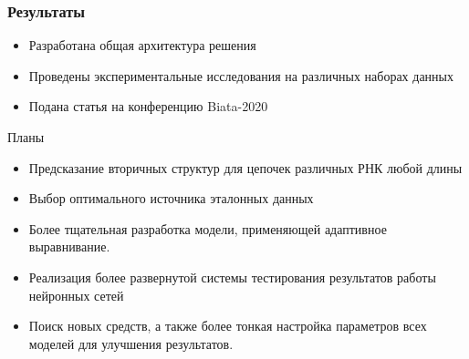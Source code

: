 \documentclass{beamer}
\begin{document}
\begin{frame}\frametitle{Результаты}
\begin{itemize}
    \item Разработана общая архитектура решения
    \item Проведены экспериментальные исследования на различных наборах данных
    \item Подана статья на конференцию Biata-2020
\end{itemize}
\end{frame}

\begin{frame}{Планы}
\begin{itemize}
    \item Предсказание вторичных структур для цепочек различных РНК любой длины
    \item Выбор оптимального источника эталонных данных
    \item Более тщательная разработка модели, применяющей адаптивное выравнивание.
    \item Реализация более развернутой системы тестирования результатов работы нейронных сетей
    \item Поиск новых средств, а также более тонкая настройка параметров всех моделей для улучшения результатов.
\end{itemize}

\end{frame}
\end{document}
